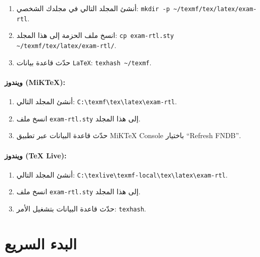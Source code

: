 \documentclass[a4paper]{article}
\newcommand{\engsf}[1]{\textenglish{\textsf{#1}}}
\newcommand{\engtt}[1]{\textenglish{\texttt{#1}}}
\begin{document}
\begin{enumerate}
    \item أنشئ المجلد التالي في مجلدك الشخصي: \engtt{mkdir -p \~{}/texmf/tex/latex/exam-rtl}.
    
   \item انسخ ملف الحزمة إلى هذا المجلد: \engtt{cp exam-rtl.sty \~{}/texmf/tex/latex/exam-rtl/}.
   
    \item حدّث قاعدة بيانات \engtt{LaTeX}: \engtt{texhash \~{}/texmf}.
\end{enumerate}

\paragraph*{ويندوز \engsf{(MiKTeX)}:}

\begin{enumerate}
    \item أنشئ المجلد التالي: \engtt{C:\textbackslash texmf\textbackslash tex\textbackslash latex\textbackslash exam-rtl}.
    
    \item انسخ ملف \engtt{exam-rtl.sty} إلى هذا المجلد.
    
    \item حدّث قاعدة البيانات عبر تطبيق \engsf{MiKTeX Console} باختيار \engsf{``Refresh FNDB''}.
\end{enumerate}

\paragraph*{ويندوز \engsf{(TeX Live)}:}

\begin{enumerate}
    \item أنشئ المجلد التالي: \engtt{C:\textbackslash texlive\textbackslash texmf-local\textbackslash tex\textbackslash latex\textbackslash exam-rtl}.
    
    \item انسخ ملف \engtt{exam-rtl.sty} إلى هذا المجلد.
    
    \item حدّث قاعدة البيانات بتشغيل الأمر: \engtt{texhash}.
\end{enumerate}
\section{البدء السريع}
\end{document}
